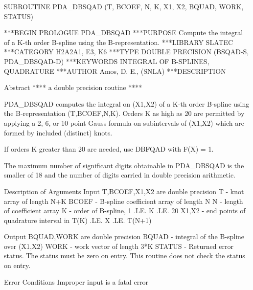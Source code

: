 \documentclass[11pt,twoside,nolof]{starlink}
\begin{document}


\begin{terminalv}
      SUBROUTINE PDA_DBSQAD (T, BCOEF, N, K, X1, X2, BQUAD, WORK, STATUS)


***BEGIN PROLOGUE  PDA_DBSQAD
***PURPOSE  Compute the integral of a K-th order B-spline using the
            B-representation.
***LIBRARY   SLATEC
***CATEGORY  H2A2A1, E3, K6
***TYPE      DOUBLE PRECISION (BSQAD-S, PDA_DBSQAD-D)
***KEYWORDS  INTEGRAL OF B-SPLINES, QUADRATURE
***AUTHOR  Amos, D. E., (SNLA)
***DESCRIPTION

     Abstract    **** a double precision routine ****

         PDA_DBSQAD computes the integral on (X1,X2) of a K-th order
         B-spline using the B-representation (T,BCOEF,N,K).  Orders
         K as high as 20 are permitted by applying a 2, 6, or 10
         point Gauss formula on subintervals of (X1,X2) which are
         formed by included (distinct) knots.

         If orders K greater than 20 are needed, use DBFQAD with
         F(X) = 1.

         The maximum number of significant digits obtainable in
         PDA_DBSQAD is the smaller of 18 and the number of digits
         carried in double precision arithmetic.

     Description of Arguments
         Input      T,BCOEF,X1,X2 are double precision
           T      - knot array of length N+K
           BCOEF  - B-spline coefficient array of length N
           N      - length of coefficient array
           K      - order of B-spline, 1 .LE. K .LE. 20
           X1,X2  - end points of quadrature interval in
                    T(K) .LE. X .LE. T(N+1)

         Output     BQUAD,WORK are double precision
           BQUAD  - integral of the B-spline over (X1,X2)
           WORK   - work vector of length 3*K
           STATUS - Returned error status.
                    The status must be zero on entry. This
                    routine does not check the status on entry.

     Error Conditions
         Improper input is a fatal error


\end{terminalv}
\end{document}
